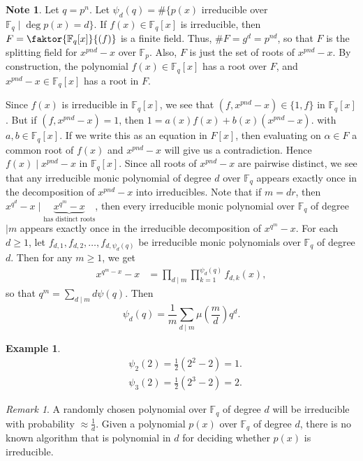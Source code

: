 \documentclass[10pt,letterpaper,cm]{nupset}
\theoremstyle{definition}
\newtheorem{exmp}[definition]{Example}
\newtheorem{note}[definition]{Note}
\theoremstyle{theorem}
\theoremstyle{remark}
\newtheorem{remark}[definition]{Remark}
\newcommand{\F}{\mathbb F}
\newcommand{\1}{\mathbf{1}}
\newcommand{\0}{\vec 0}
\begin{document}
\begin{note}
Let $q= p^n$. Let $\psi_d(q) = \#\{p(x)$ irreducible over $\F_q \mid \deg{p(x)} =d \}$. If $f(x) \in \F_q[x]$ is irreducible, then $F = \faktor{\F_q[x]}{(f)}$ is a finite field. Thus, $\#F = g^d = p^{nd}$, so that $F$ is the splitting field for $x^{pnd}-x$ over $\F_p$. Also, $F$ is just the set of roots of $x^{pnd}-x$.  By construction, the polynomial $f(x) \in \F_q[x]$ has a root over $F$, and $x^{pnd}-x \in \F_q[x]$ has a root in $F$. 

Since $f(x)$ is irreducible in $\F_q[x]$, we see that $(f, x^{pnd}-x) \in \{1,f\}$ in $\F_q[x]$. But if $(f, x^{pnd}-x)=1$, then $1 = a(x)f(x) + b(x)(x^{pnd}-x)$.  with $a, b\in \F_q[x]$. If we write this as an equation in $F[x]$, then evaluating on $\alpha \in F$ a common root of $f(x)$ and $x^{pnd}-x$ will give us a contradiction. Hence $f(x) \mid x^{pnd}-x$ in $\F_q[x]$. Since all roots of $x^{pnd}-x$ are pairwise distinct, we see that any irreducible monic polynomial of degree $d$ over $\F_q$ appears exactly once in the decomposition of $x^{pnd}-x$ into irreducibles. Note that if $m =dr$, then $x^{q^d}-x \mid \underbrace{x^{q^m} -x}_{\text{has distinct roots}}$, then every irreducible monic polynomial over $\F_q$ of degree $\mid m$ appears exactly once in the irreducible decomposition of $x^{q^m}-x$. For each $d\geq 1$, let $f_{d,1}, f_{d,2}, \ldots, f_{d, \psi_d(q)}$ be irreducible monic polynomials over $\F_q$ of degree $d$. Then for any $m\geq 1$, we get
\begin{align*}
x^{q^m -x}-x & = \prod_{d\mid m} \prod_{k=1}^{\psi_d(q)}f_{d,k}(x),
\end{align*}
so that $q^m = \sum_{d\mid m} d\psi(q)$. Then $$ \psi_d(q) = \frac{1}{m}\sum_{d\mid m}\mu\left(\frac{m}{d}\right)q^d  .$$ 
\end{note}

\begin{exmp}
\begin{align*}
& \psi_2(2) = \frac{1}{2}(2^2-2)=1.
\\ &  \psi_3(2) = \frac{1}{2}(2^3 -2) =2.
\end{align*}
\end{exmp}

\begin{remark}
A randomly chosen polynomial over $\F_q$ of degree $d$ will be irreducible with probability $\approx \frac{1}{d}$. Given a polynomial $p(x)$ over $\F_q$ of degree $d$, there is no known algorithm that is polynomial in $d$ for deciding whether $p(x)$  is irreducible. 
\end{remark}
\end{document}
